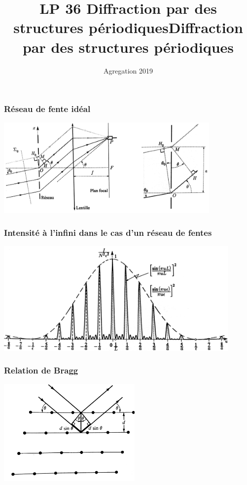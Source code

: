 \documentclass{beamer}
\title{LP 36 Diffraction par des structures périodiques}
\author{}
\date{Agregation 2019}
\begin{document}
	
\begin{frame}
\titlepage
\end{frame}

\addtocounter{framenumber}{-1}
\title{Diffraction par des structures périodiques}

\begin{frame}
\frametitle{Réseau de fente idéal}
\centerline{\includegraphics[width=11cm]{reseau}}
\end{frame}

\begin{frame}
\frametitle{Intensité à l'infini dans le cas d'un réseau de fentes}
\centerline{\includegraphics[width=12cm]{intensite}}
\end{frame}


\begin{frame}
\frametitle{Relation de Bragg}
\centerline{\includegraphics[width=7cm]{bragg}}
\end{frame}
\end{document}

